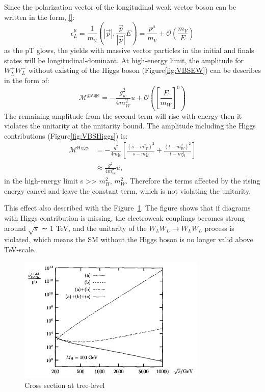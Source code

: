Since the polarization vector of the longitudinal weak vector boson can be written in the form, \ref{}: %
\begin{equation}
\epsilon_{L}^{\mu}=\frac{1}{m_{V}}\left(|\vec{p}|, \frac{\vec{p}}{|\vec{p}|} E\right)=\frac{p^{\mu}}{m_{V}}+\mathcal{O}\left(\frac{m_{V}}{E}\right)
\end{equation}
as the pT glows, the yields with massive vector particles in the initial and finals states will be longitudinal-dominant.
At high-energy limit, the amplitude for $W_L^+W_L^-$ without existing of the Higgs boson (Figure\ref{fig:VBSEW}) can be describes in the form of:
\begin{equation}
\mathcal{M}^{\text {gauge}}=-\frac{g_{w}^{2}}{4 m_{W}^{2}} u+\mathcal{O}\left(\left[\frac{E}{m_{W}}\right]^{0}\right)
\end{equation}
The remaining amplitude from the second term will rise with energy then it violates the unitarity at the unitarity bound. The amplitude including the Higgs contributions (Figure\ref{fig:VBSHiggs}) is:
\begin{equation}
\begin{aligned}
\mathcal{M}^{\text {Higgs}} &=-\frac{g^{2}}{4 m_{W}^{2}}\left[\frac{\left(s-m_{W}^{2}\right)^{2}}{s-m_{H}^{2}}+\frac{\left(t-m_{W}^{2}\right)^{2}}{t-m_{H}^{2}}\right] \\
& \approx \frac{g^{2}}{4 m_{W}^{2}} u,
\end{aligned}
\end{equation}
in the high-energy limit s >> $m_{H}^{2}$, $m_{W}^{2}$.
Therefore the terms affected by the rising energy cancel and leave the constant term, which is not violating the unitarity.

This effect also described with the Figure~\ref{fig:violation}.
The figure shows that if diagrams with Higgs contribution is missing, the electroweak couplings becomes strong around $\sqrt{s}$ ∼ 1 TeV, and the unitarity of the $W_LW_L \rightarrow W_LW_L$ process is violated, which means the SM without the Higgs boson is no longer valid above TeV-scale. 

\begin{figure}[tbp]
\begin{center}
 \includegraphics[width=0.80\textwidth,keepaspectratio]{figures/violation}
\caption{
Cross section at tree-level %
}
\label{fig:violation}
\end{center}
\end{figure}

